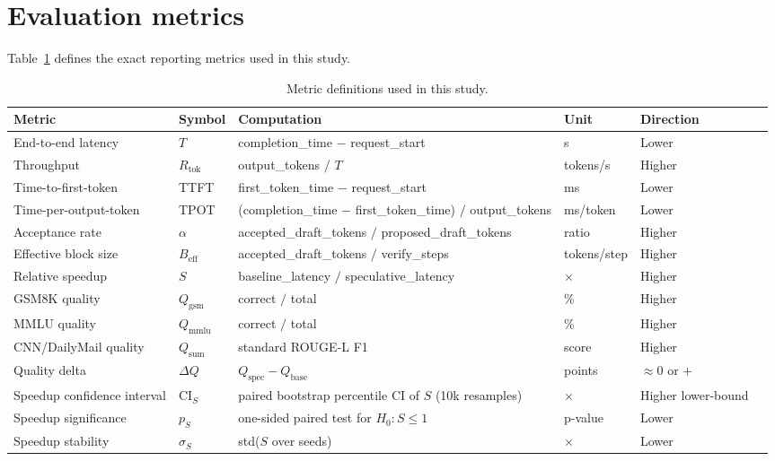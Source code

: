 \section{Evaluation metrics}
\label{sec:metrics}

Table~\ref{tab:metrics} defines the exact reporting metrics used in this study.

\begin{table}[t]
\centering
\caption{Metric definitions used in this study.}
\label{tab:metrics}
\small
\begin{tabular}{llllll}
\hline
\textbf{Metric} & \textbf{Symbol} & \textbf{Computation} & \textbf{Unit} & \textbf{Direction} \\
\hline
End-to-end latency & $T$ & completion\_time $-$ request\_start & s & Lower \\
Throughput & $R_{\text{tok}}$ & output\_tokens $/$ $T$ & tokens/s & Higher \\
Time-to-first-token & TTFT & first\_token\_time $-$ request\_start & ms & Lower \\
Time-per-output-token & TPOT & (completion\_time $-$ first\_token\_time) $/$ output\_tokens & ms/token & Lower \\
Acceptance rate & $\alpha$ & accepted\_draft\_tokens $/$ proposed\_draft\_tokens & ratio & Higher \\
Effective block size & $B_{\text{eff}}$ & accepted\_draft\_tokens $/$ verify\_steps & tokens/step & Higher \\
Relative speedup & $S$ & baseline\_latency $/$ speculative\_latency & $\times$ & Higher \\
GSM8K quality & $Q_{\text{gsm}}$ & correct $/$ total & \% & Higher \\
MMLU quality & $Q_{\text{mmlu}}$ & correct $/$ total & \% & Higher \\
CNN/DailyMail quality & $Q_{\text{sum}}$ & standard ROUGE-L F1 & score & Higher \\
Quality delta & $\Delta Q$ & $Q_{\text{spec}} - Q_{\text{base}}$ & points & $\approx 0$ or $+$ \\
Speedup confidence interval & CI$_S$ & paired bootstrap percentile CI of $S$ (10k resamples) & $\times$ & Higher lower-bound \\
Speedup significance & $p_S$ & one-sided paired test for $H_0: S\le 1$ & p-value & Lower \\
Speedup stability & $\sigma_S$ & std($S$ over seeds) & $\times$ & Lower \\
\hline
\end{tabular}
\end{table}

